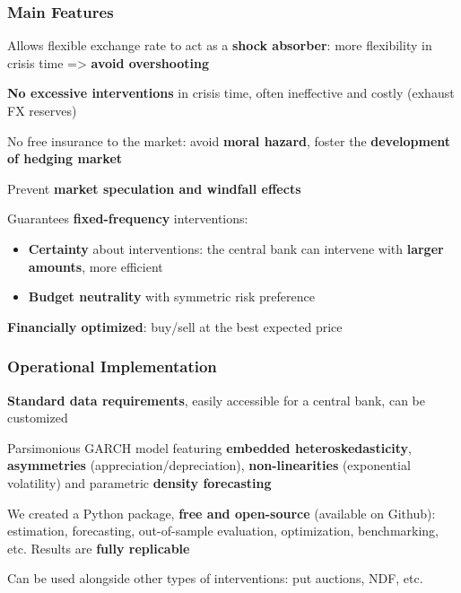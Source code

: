 \documentclass{beamer}
\newenvironment{wideitemize}{\itemize\addtolength{\itemsep}{10pt}}{\enditemize}
\newenvironment{wideenumerate}{\enumerate\addtolength{\itemsep}{10pt}}{\endenumerate}
\begin{document}
\begin{frame}
    \frametitle{Main Features}
  \begin{wideenumerate}
  \item Allows flexible exchange rate to act as a \textbf{shock absorber}:
    more flexibility in crisis time => \textbf{avoid overshooting}
  \item \textbf{No excessive interventions} in crisis time, often ineffective
    and costly (exhaust FX reserves)
  \item No free insurance to the market: avoid \textbf{moral
      hazard}, foster the \textbf{development of hedging market}
  \item Prevent \textbf{market speculation and windfall effects}
  \item Guarantees \textbf{fixed-frequency} interventions: 
    \begin{itemize}
    \item \textbf{Certainty} about interventions: the central bank can intervene with
      \textbf{larger amounts}, more efficient
    \item \textbf{Budget neutrality} with symmetric risk preference
    \end{itemize}
  \item \textbf{Financially optimized}: buy/sell at the best expected price
  \end{wideenumerate}  
\end{frame}


\begin{frame}
  \frametitle{Operational Implementation}
  \begin{wideitemize}
  \item \textbf{Standard data requirements}, easily accessible for a central
    bank, can be customized
  \item Parsimonious GARCH model featuring \textbf{embedded heteroskedasticity},  \textbf{asymmetries}
    (appreciation/depreciation), \textbf{non-linearities} (exponential
    volatility) and parametric \textbf{density forecasting}    
  \item We created a Python package, \textbf{free and open-source}  (available on Github): estimation, forecasting,
    out-of-sample evaluation, optimization, benchmarking, etc. Results are \textbf{fully replicable}
  \item Can be used alongside other types of interventions: put auctions, NDF, etc.
  \end{wideitemize}
\end{frame}
\end{document}
